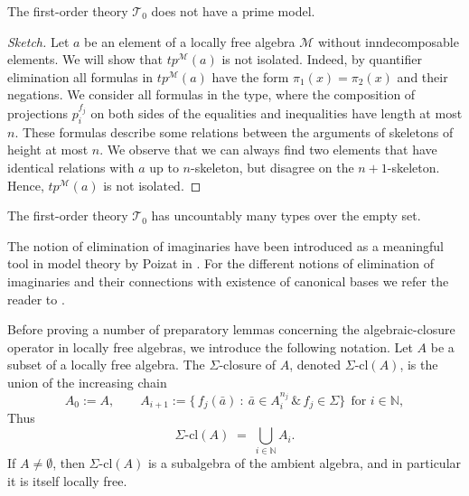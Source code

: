 \documentclass[a4paper,11pt]{article}
\begin{document}
\begin{proposition}
The first-order theory $\mathcal{T}_0$ does not have a prime model.
\end{proposition}
\begin{proof}[Sketch]
Let $a$ be an element of a locally free algebra $\mathcal{M}$ without inndecomposable elements. We will show that $tp^{\mathcal{M}}(a)$ is not isolated. Indeed, by quantifier elimination all formulas in $tp^{\mathcal{M}}(a)$ have the form $\pi_1(x)=\pi_2(x)$ and their negations. We consider all formulas in the type, where the composition of projections $p_i^{f_j}$ on both sides of the equalities and inequalities have length at most $n$. These formulas describe some relations between the arguments of skeletons of height at most $n$. We observe that we can always find two elements that have identical relations with $a$ up to $n$-skeleton, but disagree on the $n+1$-skeleton. Hence, $tp^{\mathcal{M}}(a)$ is not isolated.    
\end{proof}

\begin{corollary}\label{UncountablyT0}
The first-order theory $\mathcal{T}_0$ has uncountably many types over the empty set.
\end{corollary}

The notion of elimination of imaginaries have been introduced as a meaningful tool in model theory by Poizat in \cite{poizat1983galois}. For the different notions of elimination of imaginaries and their connections with existence of canonical bases we refer the reader to \cite{CasanovasFarre2004WeakEI}.

Before proving a number of preparatory lemmas concerning the algebraic-closure operator in locally free algebras, we introduce the following notation. Let $A$ be a subset of a locally free algebra. The $\Sigma$-closure of $A$, denoted $\Sigma\text{-}\mathrm{cl}(A)$, is the union of the increasing chain
\[
A_0:=A,\qquad 
A_{i+1}:=\{\, f_j(\bar a)\ :\ \bar a\in A_i^{n_j}\, \& \, f_j\in \Sigma\}\ \ \text{for } i\in\mathbb{N},
\]
Thus
\[
\Sigma\text{-}\mathrm{cl}(A)\;=\;\bigcup_{i\in\mathbb{N}} A_i.
\]
If $A\neq\emptyset$, then $\Sigma\text{-}\mathrm{cl}(A)$ is a subalgebra of the ambient algebra, and in particular it is itself locally free.
\end{document}
